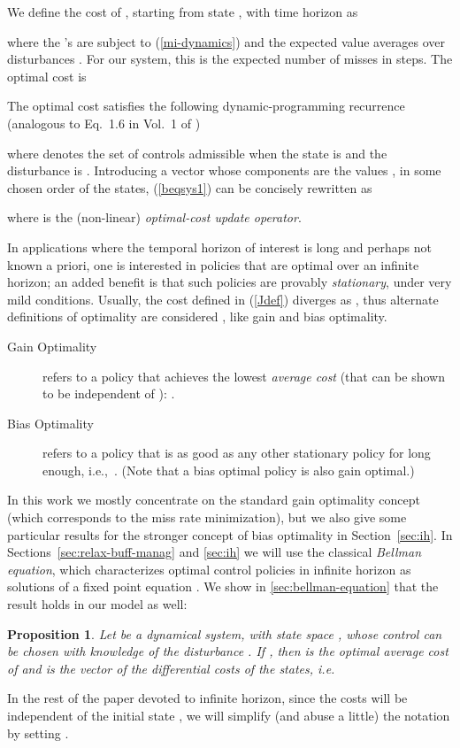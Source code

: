 \documentclass[11pt,a4paper]{article}
\newtheorem{proposition}{Proposition}
\theoremstyle{definition}
\theoremstyle{remark}
\begin{document}
We define the cost of , starting from state , with time
horizon  as

where the 's are subject to (\ref{mi-dynamics}) and the expected value
averages over disturbances . For our system, this is the expected number of
misses in  steps. The optimal cost is

The optimal cost satisfies the following dynamic-programming
recurrence (analogous to Eq.~1.6 in Vol.~1 of \cite{Bertsekas00})

where  denotes the set of controls admissible when the state is 
and the disturbance is .  Introducing a vector  whose components
are the values , in some chosen order of the states,
(\ref{beqsys1}) can be concisely rewritten as

where  is the (non-linear) \emph{optimal-cost update operator}.

In applications where the temporal horizon of interest is long and perhaps not
known a priori, one is interested in policies that are optimal over an infinite
horizon; an added benefit is that such policies are provably \emph{stationary},
under very mild conditions.  Usually, the cost defined in (\ref{Jdef}) diverges
as , thus alternate definitions of optimality are
considered \cite{Bertsekas00,LewisP02,ArapostathisBFGM93,blackwell1962discrete},
like gain and bias optimality.
\begin{description}
\item[Gain Optimality] refers to a policy  that achieves the lowest \emph{
    average cost} (that can be shown to be independent of ):  .
\item[Bias Optimality] refers to a policy  that is as good as any other
  stationary policy for  long enough, i.e.,\ . (Note that a bias optimal policy is also gain optimal.)
\end{description}

In this work we mostly concentrate on the standard gain optimality concept
(which corresponds to the miss rate minimization), but we also give some
particular results for the stronger concept of bias optimality in
Section~\ref{sec:ih}.  In Sections~\ref{sec:relax-buff-manag} and \ref{sec:ih}
we will use the classical \emph{Bellman equation}, which characterizes optimal
control policies in infinite horizon as solutions of a fixed point equation
\cite{Bertsekas00}. We show in \ref{sec:bellman-equation} that the result holds
in our model as well:
\begin{proposition}\label{bel}
  Let  be a dynamical system, with state space , whose control 
  can be chosen with knowledge of the disturbance . If
     ,     then  is the \emph{optimal average cost} of  and
   is the vector of the \emph{differential costs} of the
  states, i.e.
  
\end{proposition}
In the rest of the paper devoted to infinite horizon, since the costs will be
independent of the initial state , we will simplify (and abuse a little)
the notation by setting .
\end{document}
